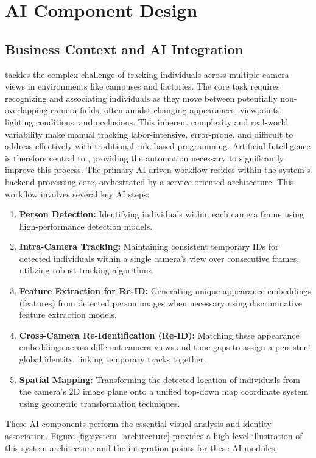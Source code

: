 \chapter{AI Component Design}
\label{chap}
\section{Business Context and AI Integration}
\label{section:business_context} %
\usevar{\srsTitle} tackles the complex challenge of tracking individuals across multiple camera views in environments like campuses and factories. The core task requires recognizing and associating individuals as they move between potentially non-overlapping camera fields, often amidst changing appearances, viewpoints, lighting conditions, and occlusions. This inherent complexity and real-world variability make manual tracking labor-intensive, error-prone, and difficult to address effectively with traditional rule-based programming. Artificial Intelligence is therefore central to \usevar{\srsTitle}, providing the automation necessary to significantly improve this process.
The primary AI-driven workflow resides within the system's backend processing core, orchestrated by a service-oriented architecture. This workflow involves several key AI steps:
\begin{enumerate}
    \item \textbf{Person Detection:} Identifying individuals within each camera frame using high-performance detection models.
    \item \textbf{Intra-Camera Tracking:} Maintaining consistent temporary IDs for detected individuals within a single camera's view over consecutive frames, utilizing robust tracking algorithms.
    \item \textbf{Feature Extraction for Re-ID:} Generating unique appearance embeddings (features) from detected person images when necessary using discriminative feature extraction models.
    \item \textbf{Cross-Camera Re-Identification (Re-ID):} Matching these appearance embeddings across different camera views and time gaps to assign a persistent global identity, linking temporary tracks together.
    \item \textbf{Spatial Mapping:} Transforming the detected location of individuals from the camera's 2D image plane onto a unified top-down map coordinate system using geometric transformation techniques.
\end{enumerate}
These AI components perform the essential visual analysis and identity association. Figure \ref{fig:system_architecture} provides a high-level illustration of this system architecture and the integration points for these AI modules.
